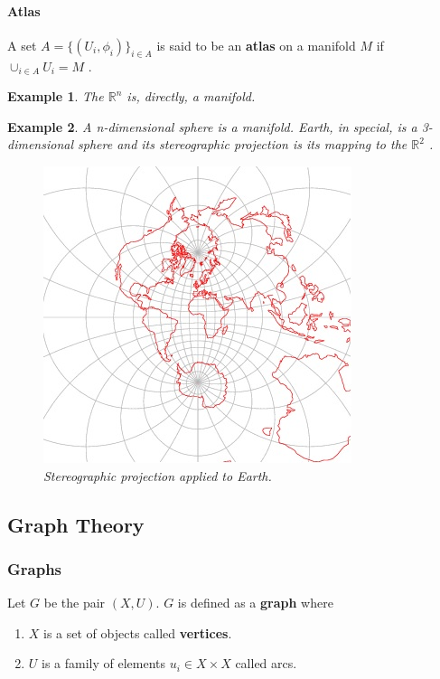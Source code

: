 \documentclass[12pt]{article}
\newtheorem{example}{Example}[section]
\begin{document}
\paragraph{Atlas}

A set $A = \{(U_i, \phi_i)\}_{i \in A}$ is said to be an \textbf{atlas} on a manifold $M$ if $\cup_{i \in A} U_i = M$ \cite{lee2012}.

\begin{example}
	The $\mathbb{R}^n$ is, directly, a manifold.
\end{example}

\begin{example}
	A n-dimensional sphere is a manifold. Earth, in special, is a 3-dimensional sphere and its stereographic projection is its mapping to the $\mathbb{R}^2$ \cite{stereo_proj}.

	\begin{figure}[H]
		\centering
		\captionsetup{justification=centering}

		\includegraphics[scale=.8]{stereo_earth}
		\caption{Stereographic projection applied to Earth.}
		\label{fig:stereographic_earth}
	\end{figure}
\end{example}

\subsection{Graph Theory}
\subsubsection{Graphs}

Let $G$ be the pair $(X, U)$. $G$ is defined as a \textbf{graph} \cite{berge1973} where
\begin{enumerate}
	\item $X$ is a set of objects called \textbf{vertices}.
	\item $U$ is a family of elements $u_i \in X\times X$ called arcs.
\end{enumerate}
\end{document}
